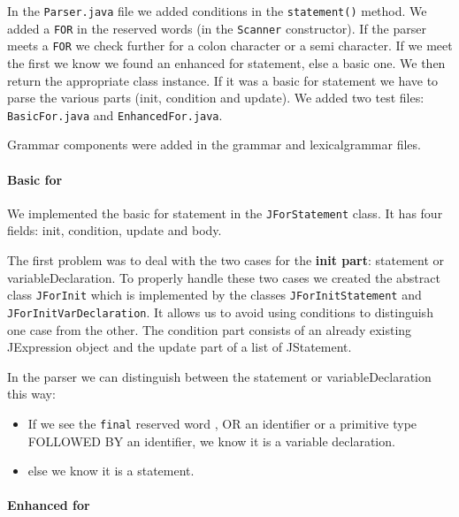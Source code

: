 \documentclass[a4paper, 12pt]{article}
\begin{document}
            In the \texttt{Parser.java} file we added conditions in the \texttt{statement()} method. We added a \texttt{FOR} in the reserved words (in the \texttt{Scanner} constructor). If the parser meets a \texttt{FOR} we check further for a colon character or a semi character. If we meet the first we know we found an enhanced for statement, else a basic one. We then return the appropriate class instance. If it was a basic for statement we have to parse the various parts (init, condition and update). We added two test files: \texttt{BasicFor.java} and \texttt{EnhancedFor.java}.
            
            Grammar components were added in the grammar and lexicalgrammar files.
        
            \paragraph{Basic for}
        
                We implemented the basic for statement in the \texttt{JForStatement} class. It has four fields: init, condition, update and body.
        
                The first problem was to deal with the two cases for the \textbf{init part}: statement or variableDeclaration. To properly handle these two cases we created the abstract class \texttt{JForInit} which is implemented by the classes \texttt{JForInitStatement} and \texttt{JForInitVarDeclaration}. It allows us to avoid using conditions to distinguish one case from the other. The condition part consists of an already existing JExpression object and the update part of a list of JStatement. 
                                
                In the parser we can distinguish between the statement or variableDeclaration this way:
                
                \begin{itemize}
                    \item If we see the \texttt{final} reserved word , OR an identifier or a primitive type FOLLOWED BY an identifier, we know it is a variable declaration.
                    \item else we know it is a statement.
                \end{itemize}
                
            \paragraph{Enhanced for}
            
\end{document}
